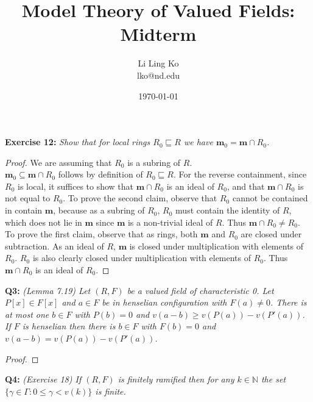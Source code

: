 \documentclass{article}
\begin{document}
\title{Model Theory of Valued Fields: Midterm}
\author{Li Ling Ko\\ lko@nd.edu}
\date{\today}
\maketitle

\textbf{Exercise 12:} \it Show that for local rings $R_0\sqsubseteq R$ we
  have $\bm{m}_0=\bm{m}\cap R_0$.

  \begin{proof}
    We are assuming that $R_0$ is a subring of $R$. \\

    $\bm{m}_0\subseteq\bm{m}\cap R_0$ follows by definition of
    $R_0\sqsubseteq R$. For the reverse containment, since $R_0$ is local,
    it suffices to show that $\bm{m}\cap R_0$ is an ideal of $R_0$, and
    that $\bm{m}\cap R_0$ is not equal to $R_0$. To prove the second
    claim, observe that $R_0$ cannot be contained in contain $\bm{m}$,
    because as a subring of $R_0$, $R_0$ must contain the identity of $R$,
    which does not lie in $\bm{m}$ since $\bm{m}$ is a non-trivial ideal of
    $R$. Thus $\bm{m}\cap R_0\neq R_0$. \\ 

    To prove the first claim, observe that as rings, both $\bm{m}$
    and $R_0$ are closed under subtraction. As an ideal of $R$, $\bm{m}$ is
    closed under multiplication with elements of $R_0$. $R_0$ is also
    clearly closed under multiplication with elements of $R_0$. Thus
    $\bm{m}\cap R_0$ is an ideal of $R_0$.
  \end{proof}

\textbf{Q3:} \it (Lemma 7.19) Let $(R,F)$ be a valued field of
  characteristic 0. Let $P[x]\in F[x]$ and $a\in F$ be in henselian
  configuration with $F(a)\neq0$. There is at most one $b\in F$ with
  $P(b)=0$ and $v(a-b)\geq v(P(a))-v(P'(a))$. If $F$ is henselian then
  there is $b\in F$ with $F(b)=0$ and $v(a-b)=v(P(a))-v(P'(a))$.

  \begin{proof}
  \end{proof}

\textbf{Q4:} \it (Exercise 18) If $(R,F)$ is finitely ramified then for any
  $k\in\mathbb{N}$ the set $\{\gamma\in\Gamma: 0\leq\gamma<v(k)\}$ is finite.
\end{document}
